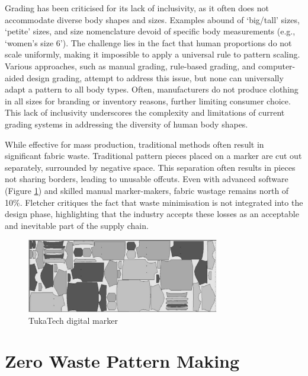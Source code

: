 Grading has been criticised for its lack of inclusivity, as it often does not accommodate diverse body shapes and sizes. Examples abound of `big/tall' sizes, `petite' sizes, and size nomenclature devoid of specific body measurements (e.g., `women's size 6'). The challenge lies in the fact that human proportions do not scale uniformly, making it impossible to apply a universal rule to pattern scaling. Various approaches, such as manual grading, rule-based grading, and computer-aided design grading, attempt to address this issue, but none can universally adapt a pattern to all body types. Often, manufacturers do not produce clothing in all sizes for branding or inventory reasons, further limiting consumer choice. This lack of inclusivity underscores the complexity and limitations of current grading systems in addressing the diversity of human body shapes.

While effective for mass production, traditional methods often result in significant fabric waste. Traditional pattern pieces placed on a marker are cut out separately, surrounded by negative space. This separation often results in pieces not sharing borders, leading to unusable offcuts. Even with advanced software (Figure \ref{fig:digital_marker_layout}) and skilled manual marker-makers, fabric wastage remains north of 10\%. Fletcher critiques the fact that waste minimisation is not integrated into the design phase, highlighting that the industry accepts these losses as an acceptable and inevitable part of the supply chain.
\begin{figure} [htb]
    \centering
    \includegraphics[width=0.75\textwidth]{Images/digital marker layout.png}
    \caption{TukaTech digital marker \cite{joseph-armstrong_patternmaking_2014}}
    \label{fig:digital_marker_layout}
\end{figure}

\section{Zero Waste Pattern Making}
